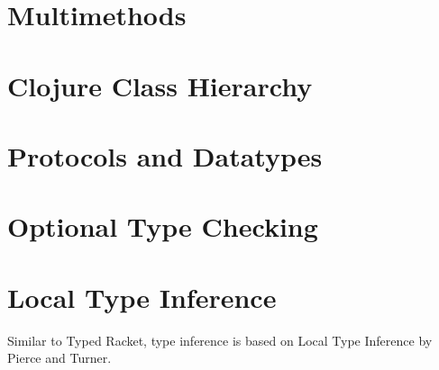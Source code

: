 \section{Multimethods}


%
%
%
%
%

\section{Clojure Class Hierarchy}
\section{Protocols and Datatypes}
\section{Optional Type Checking}
\section{Local Type Inference}

Similar to Typed Racket, type inference is based on Local Type Inference
by Pierce and Turner.

